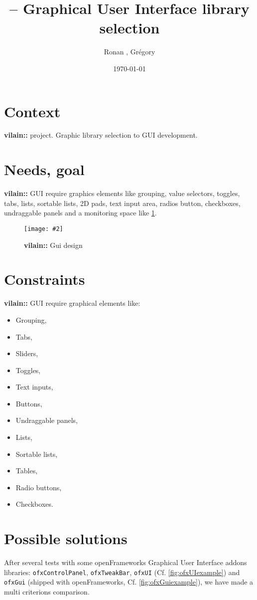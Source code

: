 \documentclass[a4paper,titlepage,oneside]{article}
\author{Ronan \bsc{Legardinier}, Grégory \bsc{David}}
\title{\vilain{} -- Graphical User Interface library selection}
\date{\today{}}
\newcommand{\image}[5][\textwidth]{%
    \begin{figure}[h]
        \centering
            \begin{minipage}[c]{#1}
                \centering
                \texttt{[image: \#2]}
                \caption{#4}
                \label{#5}
            \end{minipage}
    \end{figure}
}
\newcommand{\vilain}{\textbf{vilain::}}
\newcommand{\OF}{openFrameworks}
\begin{document}
\maketitle{}
\tableofcontents{}
\newpage

\section{Context}
\vilain{} project. Graphic library selection to GUI development.

\section{Needs, goal}
\vilain{} GUI require graphics elements like grouping, value selectors, toggles, tabs, lists, sortable lists, 2D pads, text input area, radios button, checkboxes, undraggable panels and a monitoring space like \figurename
\ref{fig:GuiDesign}.

\image{data/GUIDesign.jpg}{width=13cm}{\vilain{} Gui design}{fig:GuiDesign}

\newpage
\section{Constraints}
\vilain{} GUI require graphical elements like:
\begin{itemize}
    \item Grouping,
    \item Tabs,
    \item Sliders,
    \item Toggles,
    \item Text inputs,
    \item Buttons,
    \item Undraggable panels,
    \item Lists,
    \item Sortable lists,
    \item Tables,
    \item Radio buttons,
    \item Checkboxes.
\end{itemize}

\newpage
\section{Possible solutions}
After several tests with some \OF{} Graphical User Interface addons libraries: \texttt{ofxControlPanel}, \texttt{ofxTweakBar}, \texttt{ofxUI} (Cf. \figurename \ref{fig:ofxUIexample}) and \texttt{ofxGui} (shipped with \OF{}, Cf. \figurename \ref{fig:ofxGuiexample}), we have made a multi criterions comparison.
\end{document}
